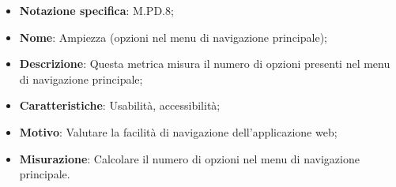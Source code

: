 \begin{itemize}
    \item \textbf{Notazione specifica}: M.PD.8;
    \item \textbf{Nome}: Ampiezza (opzioni nel menu di navigazione principale);
    \item \textbf{Descrizione}: Questa metrica misura il numero di opzioni presenti nel menu di navigazione principale;
    \item \textbf{Caratteristiche}: Usabilità, accessibilità;
    \item \textbf{Motivo}: Valutare la facilità di navigazione dell'applicazione web;
    \item \textbf{Misurazione}: Calcolare il numero di opzioni nel menu di navigazione principale.
\end{itemize}
